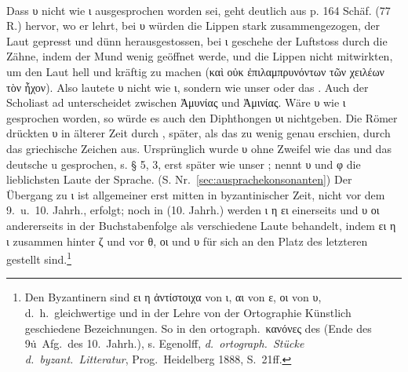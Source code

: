 \paragraph{\label{sec:ypsilon}} Dass υ nicht wie ι ausgesprochen worden sei, geht deutlich aus
 p. 164 Schäf. (77 R.) hervor, wo er lehrt, bei υ würden die
Lippen stark zusammengezogen, der Laut gepresst und dünn herausgestossen, bei ι
geschehe der Luftstoss durch die Zähne, indem der Mund wenig geöffnet werde, und
die Lippen nicht mitwirkten, um den Laut hell und kräftig zu machen (καὶ οὐκ
ἐπιλαμπρυνόντων τῶν χειλέων τὸν ἦχον). Also lautete υ nicht wie ι, sondern wie
unser  oder das  .
Auch der Scholiast ad 
unterscheidet zwischen Ἀμυνίας und Ἀμινίας.
Wäre υ wie ι gesprochen worden, so
würde es auch den Diphthongen υι nichtgeben.
Die Römer drückten υ in älterer Zeit durch , später, als das zu wenig
genau erschien, durch das griechische Zeichen  aus.
Ursprünglich wurde υ ohne Zweifel wie das   und das deutsche
u gesprochen, s. § 5, 3, erst später wie unser ;
 nennt υ
und φ die lieblichsten Laute der  Sprache.
(S. Nr.~\ref{sec:ausprachekonsonanten}) Der Übergang
zu ι ist allgemeiner erst mitten in byzantinischer Zeit, nicht vor dem 9.\ u.\ 10.
Jahrh., erfolgt; noch in  (10. Jahrh.) werden ι η ει einerseits
und υ οι andererseits in der Buchstabenfolge als verschiedene Laute behandelt,
indem ει η ι zusammen hinter ζ und vor θ, οι und υ für sich an den Platz des
letzteren gestellt sind.\footnote{Den Byzantinern sind ει η ἀντίστοιχα von ι, αι
	von ε, οι von υ, d.~h.\ gleichwertige und in der Lehre von der Ortographie
	Künstlich geschiedene Bezeichnungen. So in den ortograph.\ κανόνες des
	 (Ende des 9\. u~Afg.\ des 10.\ Jahrh.), s. Egenolff,
	\emph{d.\ ortograph.\
		Stücke d.\ byzant.\ Litteratur}, Prog.\ Heidelberg 1888, S.\ 21ff.}

